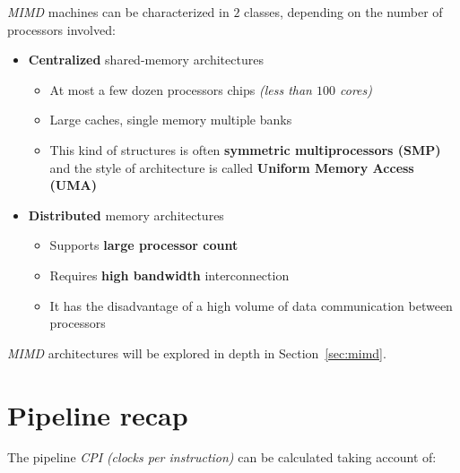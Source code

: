 \documentclass[english]{article}
\begin{document}
\textit{MIMD} machines can be characterized in \(2\) classes, depending on the number of processors involved:

\begin{itemize}
  \item \textbf{Centralized} shared-memory architectures
        \begin{itemize}
          \item At most a few dozen processors chips \textit{(less than \(100\) cores)}
          \item Large caches, single memory multiple banks
          \item This kind of structures is often \textbf{symmetric multiprocessors (SMP)} and the style of architecture is called \textbf{Uniform Memory Access (UMA)}
        \end{itemize}
  \item \textbf{Distributed} memory architectures
        \begin{itemize}
          \item Supports \textbf{large processor count}
          \item Requires \textbf{high bandwidth} interconnection
          \item It has the disadvantage of a high volume of data communication between processors
        \end{itemize}
\end{itemize}

\bigskip
\textit{MIMD} architectures will be explored in depth in Section~\ref{sec:mimd}.

\clearpage

\section{Pipeline recap}

The pipeline \textit{CPI} \textit{(clocks per instruction)} can be calculated taking account of:
\end{document}
